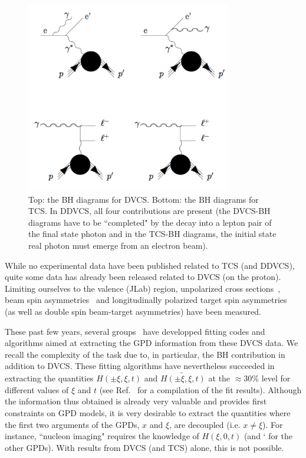 \begin{figure}[htbp]
\begin{center}
\includegraphics[width=0.8\textwidth]{allbh.pdf}
\end{center}
\caption{Top: the BH diagrams for DVCS. Bottom: the BH diagrams for TCS.
In DDVCS, all four contributions are present (the DVCS-BH diagrams have to
be ``completed" by the decay into a lepton pair of the final state photon 
and in the TCS-BH diagrams, the initial state real photon must
emerge from an electron beam).}
\label{fig:allbh}
\end{figure}

While no experimental data have been published related to TCS (and DDVCS), quite
some data has already been released related to DVCS (on the proton). 
Limiting ourselves to the valence (JLab) region, unpolarized cross 
sections~\cite{carlos,Jo:2015ema}, beam spin asymmetries~\cite{fx} and 
longitudinally polarized target spin asymmetries~\cite{shifeng,erin,Pisano:2015iqa}
(as well as double spin beam-target asymmetries) have been measured. 

These past few years, several groups~\cite{fitmuller,herve,fitmick,fithermes,fittsa,fitall} 
have developped fitting codes and algorithms aimed at extracting the GPD information 
from these DVCS data. We recall the complexity of the task due to,
in particular, the BH contribution in addition to DVCS. These fitting algorithms have 
nevertheless succeeded in extracting
the quantities $H(\pm\xi,\xi,t)$ and $\tilde{H(\pm\xi,\xi,t)}$ at the $\approx 30$\% level
for different values of $\xi$ and $t$ (see Ref.~\cite{rpp} for a compilation of the
fit results). Although the  information thus obtained is already very valuable 
and provides first constraints on GPD models, it is very desirable to extract
the quantities where the first two arguments of the GPDs, $x$ and $\xi$,
are decoupled (i.e. $x\neq\xi$). For instance, ``nucleon imaging"
requires the knowledge of $H(\xi,0,t)$ (and ` for the
other GPDs). With results from DVCS (and TCS) alone, this is not possible.

